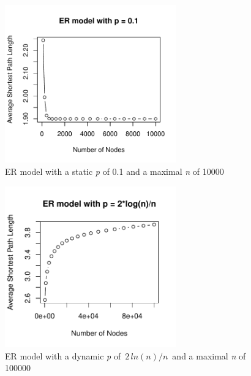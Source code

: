 \begin{figure}
    \centering
    \includegraphics[width=0.66\textwidth]{figures/ER model with p = 0.1.pdf}
    \caption{ER model with a static \textit{p} of 0.1 and a maximal \textit{n} of 10000}
    \label{fig:ER Model with p = 0.1}
\end{figure}
\begin{figure}
    \centering
    \includegraphics[width=0.66\textwidth]{figures/ermodelp2lognn100000.pdf}
    \caption{ER model with a dynamic \textit{p} of $\,2\,ln(n)/n\,$ and a maximal \textit{n} of 100000}
    \label{fig:ER Model with dynamic P}
\end{figure}